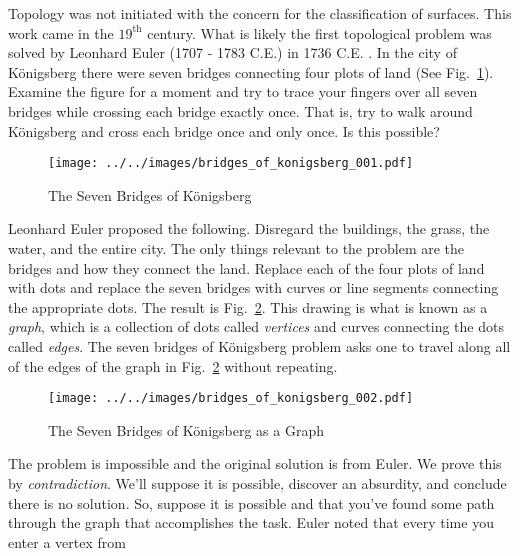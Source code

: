     Topology was not initiated with the concern for the classification of
    surfaces. This work came in the $19^{\textrm{th}}$ century. What is likely
    the first topological problem was solved by Leonhard Euler
    (1707 - 1783 C.E.) in 1736 C.E. \cite{LeonhardEulerBridgesOfKonigsberg}. In
    the city of K\"{o}nigsberg there were seven bridges connecting four plots of
    land (See Fig.~\ref{fig:bridges_of_konigsberg_001}). Examine the figure for
    a moment and try to trace your fingers over all seven bridges while crossing
    each bridge exactly once. That is, try to walk around K\"{o}nigsberg and
    cross each bridge once and only once. Is this possible?
    \begin{figure}
        \centering
        \texttt{[image: ../../images/bridges\_of\_konigsberg\_001.pdf]}
        \caption{The Seven Bridges of K\"{o}nigsberg}
        \label{fig:bridges_of_konigsberg_001}
    \end{figure}
    Leonhard Euler proposed the following. Disregard the buildings, the grass,
    the water, and the entire city. The only things relevant to the problem are
    the bridges and how they connect the land. Replace each of the four plots
    of land with dots and replace the seven bridges with curves or
    line segments connecting the appropriate dots. The result is
    Fig.~\ref{fig:bridges_of_konigsberg_002}. This drawing is what is known as
    a \textit{graph}, which is a collection of dots called
    \textit{vertices} and curves connecting the dots called
    \textit{edges}. The seven bridges of K\"{o}nigsberg problem asks one to
    travel along all of the edges of the graph in
    Fig.~\ref{fig:bridges_of_konigsberg_002} without repeating.
    \par\hfill\par
    \begin{figure}
        \centering
        \texttt{[image: ../../images/bridges\_of\_konigsberg\_002.pdf]}
        \caption{The Seven Bridges of K\"{o}nigsberg as a Graph}
        \label{fig:bridges_of_konigsberg_002}
    \end{figure}
    The problem is impossible and the original solution is from Euler. We prove
    this by \textit{contradiction}. We'll suppose it is possible, discover an
    absurdity, and conclude there is no solution. So, suppose
    it is possible and that you've found some path through the graph that
    accomplishes the task. Euler noted that every time you enter a vertex from
